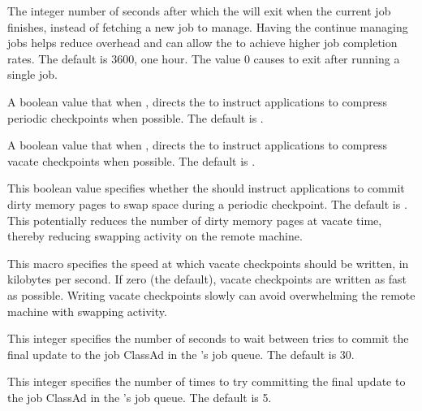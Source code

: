 \begin{description}
\label{param:ShadowWorklife}
\item[\Macro{SHADOW\_WORKLIFE}]
  The integer number of seconds after which the  will exit
  when the current job finishes, instead of fetching a new job to
  manage.  Having the  continue managing jobs helps
  reduce overhead and can allow the  to achieve higher
  job completion rates.  The default is 3600, one hour.  The value 0
  causes  to exit after running a single job.

\label{param:CompressPeriodicCkpt}
\item[\Macro{COMPRESS\_PERIODIC\_CKPT}]
  A boolean value that when , directs the 
  to instruct applications to compress periodic checkpoints when possible.
  The default is .

\label{param:CompressVacateCkpt}
\item[\Macro{COMPRESS\_VACATE\_CKPT}]
  A boolean value that when , directs the 
  to instruct applications to compress vacate checkpoints when possible.
  The default is .

\label{param:PeriodicMemorySync}
\item[\Macro{PERIODIC\_MEMORY\_SYNC}]
  This boolean value specifies whether the  should instruct
  applications to commit dirty memory pages to swap space during a
  periodic checkpoint.  The default is .  This potentially
  reduces the number of dirty memory pages at vacate time, thereby
  reducing swapping activity on the remote machine.

\label{param:SlowCkptSpeed}
\item[\Macro{SLOW\_CKPT\_SPEED}]
  This macro specifies the speed at which vacate checkpoints should be
  written, in kilobytes per second.  If zero (the default), vacate
  checkpoints are written as fast as possible.  Writing vacate
  checkpoints slowly can avoid overwhelming the remote machine with
  swapping activity.

\label{param:ShadowJobCleanupRetryDelay}
\item[\Macro{SHADOW\_JOB\_CLEANUP\_RETRY\_DELAY}]
  This integer specifies the number of seconds to wait between tries
  to commit the final update to the job ClassAd in the 's
  job queue.  The default is 30.

\label{param:ShadowMaxJobCleanupRetries}
\item[\Macro{SHADOW\_MAX\_JOB\_CLEANUP\_RETRIES}]
  This integer specifies the number of times to try committing
  the final update to the job ClassAd in the 's
  job queue.  The default is 5.

\end{description}

